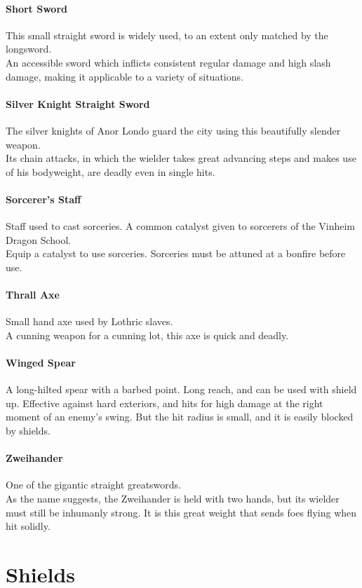 \documentclass[twocolumn,a4paper]{article}
\begin{document}
\paragraph{Short Sword}
This small straight sword is widely used, to an extent only matched by the longsword.\\
An accessible sword which inflicts consistent regular damage and high slash damage, making it applicable to a variety of situations.
\paragraph{Silver Knight Straight Sword}
The silver knights of Anor Londo guard the city using this beautifully slender weapon.\\
Its chain attacks, in which the wielder takes great advancing steps and makes use of his bodyweight, are deadly even in single hits.
\paragraph{Sorcerer’s Staff}
Staff used to cast sorceries. A common catalyst given to sorcerers of the Vinheim Dragon School.\\
Equip a catalyst to use sorceries. Sorceries must be attuned at a bonfire before use.
\paragraph{Thrall Axe}
Small hand axe used by Lothric slaves.\\
A cunning weapon for a cunning lot, this axe is quick and deadly.
\paragraph{Winged Spear}
A long-hilted spear with a barbed point. Long reach, and can be used with shield up. Effective against hard exteriors, and hits for high damage at the right moment of an enemy's swing. But the hit radius is small, and it is easily blocked by shields.
\paragraph{Zweihander}
One of the gigantic straight greatswords.\\
As the name suggests, the Zweihander is held with two hands, but its wielder must still be inhumanly strong. It is this great weight that sends foes flying when hit solidly.
\section*{Shields}
\end{document}
